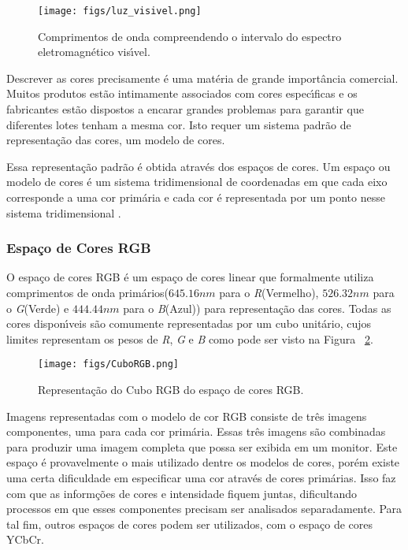 \begin{figure}[h]
\centering
\texttt{[image: figs/luz\_visivel.png]}
\caption[Comprimentos de onda do espectro vis\'{\i}vel]{Comprimentos de onda compreendendo o intervalo do espectro eletromagn\'{e}tico vis\'{\i}vel.} \label{FIG:LUZVIS}
\end{figure}

Descrever as cores precisamente \'{e} uma mat\'{e}ria de grande import\^{a}ncia comercial. Muitos produtos est\~{a}o intimamente associados com cores espec\'{\i}ficas e os fabricantes est\~{a}o dispostos a encarar grandes problemas para garantir que diferentes lotes tenham a mesma cor. Isto requer um sistema padr\~{a}o de representa\c{c}\~{a}o das cores, um modelo de cores\cite{FORSYTH:2003}.

Essa representa\c{c}\~{a}o padr\~{a}o \'{e} obtida atrav\'{e}s dos espa\c{c}os de cores. Um espa\c{c}o ou modelo de cores \'{e} um sistema tridimensional de coordenadas em que cada eixo corresponde a uma cor prim\'{a}ria e cada cor \'{e} representada por um ponto nesse sistema tridimensional \cite{BARROS:2010}.

\subsubsection{Espa\c{c}o de Cores RGB}

O espa\c{c}o de cores \ac{RGB} \'{e} um espa\c{c}o de cores linear que formalmente utiliza comprimentos de onda prim\'{a}rios($645.16 nm$ para o \emph{R}(Vermelho), $526.32 nm$ para o \emph{G}(Verde) e $444.44 nm$ para o \emph{B}(Azul)) para representa\c{c}\~{a}o das cores. Todas as cores dispon\'{\i}veis s\~{a}o comumente representadas por um cubo unit\'{a}rio, cujos limites representam os pesos de \emph{R}, \emph{G} e \emph{B} como pode ser visto na Figura ~\ref{FIG:CUBORGB}\cite{FORSYTH:2003}.

\begin{figure}[h]
\centering
\texttt{[image: figs/CuboRGB.png]}
\caption{Representa\c{c}\~{a}o do Cubo RGB do espa\c{c}o de cores RGB.} \label{FIG:CUBORGB}
\end{figure}

Imagens representadas com o modelo de cor \ac{RGB} consiste de tr\^{e}s imagens componentes, uma para cada cor prim\'{a}ria. Essas tr\^{e}s imagens s\~{a}o combinadas para produzir uma imagem completa que possa ser exibida em um monitor\cite{GONZALEZ:2008}. Este espa\c{c}o \'{e} provavelmente o mais utilizado dentre os modelos de cores, por\'{e}m existe uma certa dificuldade em especificar uma cor atrav\'{e}s de cores prim\'{a}rias. Isso faz com que as inform\c{c}\~{o}es de cores e intensidade fiquem juntas, dificultando processos em que esses componentes precisam ser analisados separadamente\cite{BARROS:2010}. Para tal fim, outros espa\c{c}os de cores podem ser utilizados, com o espa\c{c}o de cores \ac{YCbCr}.

